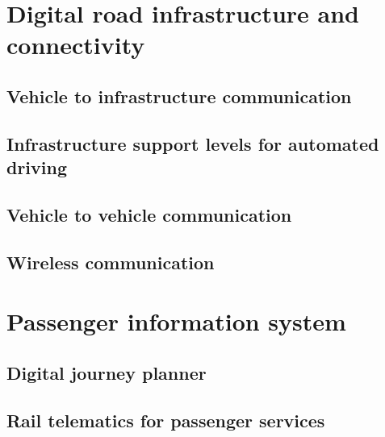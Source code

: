 \documentclass[
]{book}
\begin{document}
\hypertarget{digital}{%
\chapter{Digital road infrastructure and connectivity}\label{digital}}

\hypertarget{vehicle-to-infrastructure-communication}{%
\section{Vehicle to infrastructure communication}\label{vehicle-to-infrastructure-communication}}

\hypertarget{infrastructure-support-levels-for-automated-driving}{%
\section{Infrastructure support levels for automated driving}\label{infrastructure-support-levels-for-automated-driving}}

\hypertarget{vehicle-to-vehicle-communication}{%
\section{Vehicle to vehicle communication}\label{vehicle-to-vehicle-communication}}

\hypertarget{wireless-communication}{%
\section{Wireless communication}\label{wireless-communication}}

\hypertarget{passenger}{%
\chapter{Passenger information system}\label{passenger}}

\hypertarget{digital-journey-planner}{%
\section{Digital journey planner}\label{digital-journey-planner}}

\hypertarget{rail-telematics-for-passenger-services}{%
\section{Rail telematics for passenger services}\label{rail-telematics-for-passenger-services}}
\end{document}
